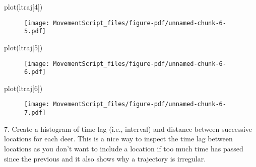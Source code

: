 \documentclass[
  letterpaper,
]{book}
\newenvironment{Shaded}{\begin{snugshade}}{\end{snugshade}}
\newcommand{\DecValTok}[1]{\textcolor[rgb]{0.68,0.00,0.00}{#1}}
\newcommand{\FunctionTok}[1]{\textcolor[rgb]{0.28,0.35,0.67}{#1}}
\newcommand{\NormalTok}[1]{\textcolor[rgb]{0.00,0.23,0.31}{#1}}
\begin{document}
\begin{Shaded}
\begin{Highlighting}[]
\FunctionTok{plot}\NormalTok{(ltraj[}\DecValTok{4}\NormalTok{])}
\end{Highlighting}
\end{Shaded}

\begin{figure}[H]

{\centering \texttt{[image: MovementScript\_files/figure-pdf/unnamed-chunk-6-5.pdf]}

}

\end{figure}

\begin{Shaded}
\begin{Highlighting}[]
\FunctionTok{plot}\NormalTok{(ltraj[}\DecValTok{5}\NormalTok{])}
\end{Highlighting}
\end{Shaded}

\begin{figure}[H]

{\centering \texttt{[image: MovementScript\_files/figure-pdf/unnamed-chunk-6-6.pdf]}

}

\end{figure}

\begin{Shaded}
\begin{Highlighting}[]
\FunctionTok{plot}\NormalTok{(ltraj[}\DecValTok{6}\NormalTok{])}
\end{Highlighting}
\end{Shaded}

\begin{figure}[H]

{\centering \texttt{[image: MovementScript\_files/figure-pdf/unnamed-chunk-6-7.pdf]}

}

\end{figure}

7. Create a histogram of time lag (i.e., interval) and distance between
successive locations for each deer. This is a nice way to inspect the
time lag between locations as you don't want to include a location if
too much time has passed since the previous and it also shows why a
trajectory is irregular.
\end{document}
